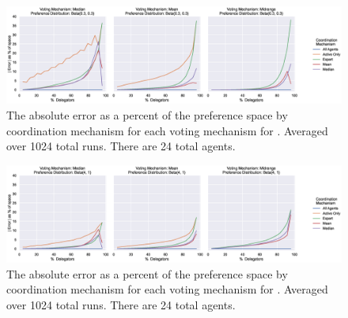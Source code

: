 \label{apx:error-by-dist-zoomed}
\begin{landscape}
    \begin{figure}[p]
        \centering
        \includegraphics[scale=0.55]
        {content/chapter2/figures/distributions/Beta_0.3_0.3_error_as_percent_of_space_abs_mean}
        \caption{
            The absolute error as a percent of the preference space by coordination
            mechanism for each voting mechanism for .
            Averaged over 1024 total runs.
            There are 24 total agents.
        }
        \label{fig:beta-.3-.3-error-as-percent-of-space-abs-mean}
    \end{figure}
\end{landscape}

\begin{landscape}
    \begin{figure}[p]
        \centering
        \includegraphics[scale=0.55]
        {content/chapter2/figures/distributions/Beta_4_1_error_as_percent_of_space_abs_mean}
        \caption{
            The absolute error as a percent of the preference space by coordination
            mechanism for each voting mechanism for .
            Averaged over 1024 total runs.
            There are 24 total agents.
        }
        \label{fig:beta-4-1-error-as-percent-of-space-abs-mean}
    \end{figure}
\end{landscape}

